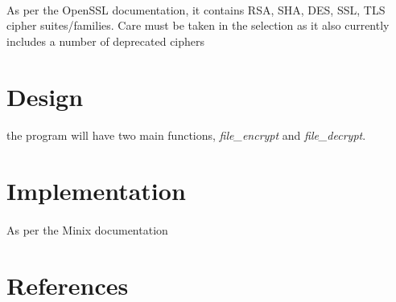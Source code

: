 \documentclass{article}
\begin{document}
\paragraph{}As per the OpenSSL documentation, it contains RSA, SHA, DES, SSL, TLS cipher suites/families. Care must be taken in the selection as it also currently includes a number of deprecated ciphers


\section{Design}
\paragraph{}the program will have two main functions, \textit{file\_encrypt} and \textit{file\_decrypt}. 

\section{Implementation}
\paragraph{}As per the Minix documentation 

\section{References}
\end{document}

